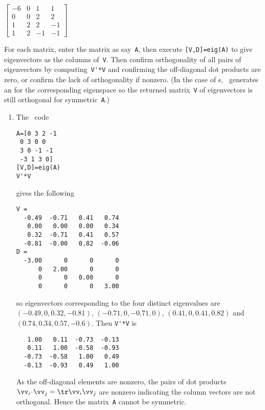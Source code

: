 \begin{example}
\begin{Parts}
\item \(\begin{bmatrix} -6 & 0 & 1 & 1
\\ 0 & 0 & 2 & 2
\\ 1 & 2 & 2 & -1
\\ 1 & 2 & -1 & -1 \end{bmatrix}\)
\end{Parts}
\begin{solution} 
For each matrix, enter the matrix as say~\verb|A|, then execute \verb|[V,D]=eig(A)| to give eigenvectors as the columns of~\verb|V|. 
Then confirm orthogonality of all pairs of eigenvectors by computing~\verb|V'*V| and confirming the off-diagonal dot products are zero, or confirm the lack of orthogonality if nonzero.
(In the case of s, \script\ generates an  for the corresponding eigenspace so the returned matrix~\verb|V| of eigenvectors is still orthogonal for symmetric~\verb|A|.)
\begin{enumerate}
\item The \script\ code 
\setbox\ajrqrbox\hbox{}%
\marginajrbox%
\begin{verbatim}
A=[0 3 2 -1
 0 3 0 0
 3 0 -1 -1
 -3 1 3 0]
[V,D]=eig(A)
V'*V
\end{verbatim}
gives the following \twodp
\begin{verbatim}
V =
  -0.49  -0.71   0.41   0.74
   0.00   0.00   0.00   0.34
   0.32  -0.71   0.41   0.57
  -0.81  -0.00   0.82  -0.06
D =
  -3.00      0      0      0
      0   2.00      0      0
      0      0   0.00      0
      0      0      0   3.00
\end{verbatim}
so eigenvectors corresponding to the four distinct eigenvalues are
\sloppy
\((-0.49,0,0.32,-0.81)\), \((-0.71,0,-0.71,0)\), \((0.41,0,0.41,0.82)\) and \((0.74,0.34,0.57,-0.6)\).
Then \verb|V'*V| is \twodp
\begin{verbatim}
   1.00   0.11  -0.73  -0.13
   0.11   1.00  -0.58  -0.93
  -0.73  -0.58   1.00   0.49
  -0.13  -0.93   0.49   1.00
\end{verbatim}
As the off-diagonal elements are nonzero,  the pairs of dot products \(\vv_i\cdot\vv_j=\tr \vv_i\vv_j\) are nonzero indicating the column vectors are not orthogonal.  
Hence the matrix~\verb|A| cannot be symmetric.


\end{enumerate}
\end{solution}
\end{example}

